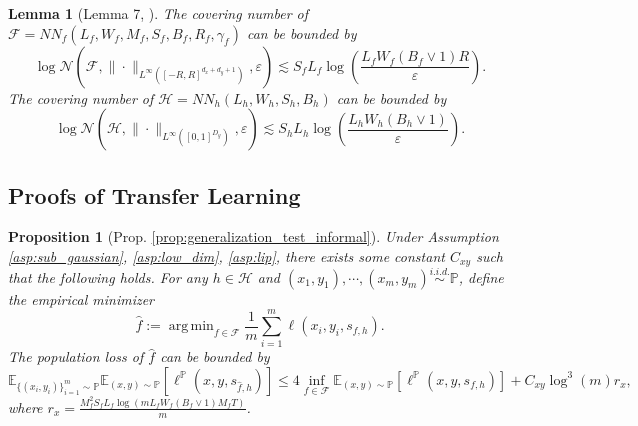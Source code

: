\documentclass{article}
\numberwithin{equation}{section}
\newcommand{\E}{\mathbb{E}}
\DeclareMathOperator*{\argmin}{arg\,min}
\newtheorem{lemma}[thm]{Lemma}
\newtheorem{prop}[thm]{Proposition}
\theoremstyle{definition}
\renewcommand{\P}{\mathbb{P}}
\begin{document}
\begin{lemma}[Lemma 7, \citet{chen2022nonparametric}]\label{lem:covering_num}
    The covering number of $\mathcal{F}=NN_f(L_f,W_f,M_f,S_f,B_f,R_f,\gamma_f)$ can be bounded by
    \begin{equation}
        \log \mathcal{N}(\mathcal{F},\|\cdot\|_{L^\infty([-R,R]^{d_x+d_y+1})},\varepsilon) \lesssim S_fL_f\log\left(\frac{L_fW_f(B_f\vee 1)R}{\varepsilon}\right).
    \end{equation}
    The covering number of $\mathcal{H}=NN_h(L_h,W_h,S_h,B_h)$ can be bounded by
    \begin{equation}
        \log \mathcal{N}(\mathcal{H},\|\cdot\|_{L^\infty([0,1]^{D_y})},\varepsilon) \lesssim S_hL_h\log\left(\frac{L_hW_h(B_h\vee 1)}{\varepsilon}\right).
    \end{equation}
\end{lemma}

\subsection{Proofs of Transfer Learning}\label{app:subsec:generalization_diversity}

\begin{prop}[Prop. \ref{prop:generalization_test_informal}]
\label{prop:generalization_test}
    Under Assumption \ref{asp:sub_gaussian}, \ref{asp:low_dim}, \ref{asp:lip}, there exists some constant $C_{xy}$ such that the following holds.
    For any $h\in\mathcal{H}$ and $(x_1,y_1),\cdots,(x_m,y_m)\overset{\textit{i.i.d.}}{\sim}\P$, define the empirical minimizer
    \begin{equation}
        \widehat{f}:= \argmin_{f\in\mathcal{F}} \frac{1}{m}\sum_{i=1}^m \ell(x_i,y_i,s_{f,h}).
    \end{equation}
    The population loss of $\widehat{f}$ can be bounded by
    \begin{equation}
        \E_{\{(x_i,y_i)\}_{i=1}^m\sim \P} \E_{(x,y)\sim\P} [\ell^\P(x,y,s_{\widehat{f},h})]\leq 4\inf_{f\in\mathcal{F}}\E_{(x,y)\sim\P}[\ell^\P(x,y,s_{f,h})] + C_{xy}\log^3(m) r_x,
    \end{equation}
    where $r_x=\frac{M_f^2S_fL_f\log\left(mL_fW_f(B_f\vee 1)M_fT\right)}{m}$.
\end{prop}
\end{document}
